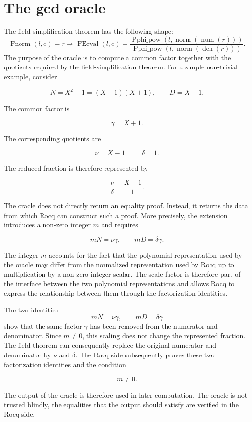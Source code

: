 \documentclass[11pt]{article}
\begin{document}
\section{The gcd oracle}
The field-simplification theorem has the following shape:
\[
 \operatorname{Fnorm}(l,e)=r \Longrightarrow
 \operatorname{FEeval}(l,e)=
 \frac{\operatorname{Pphi\_pow}(l,\operatorname{norm}(\operatorname{num}(r)))}
  {\operatorname{Pphi\_pow}(l,\operatorname{norm}(\operatorname{den}(r)))}.
\]
The purpose of the oracle is to compute a common factor together with the
quotients required by the field-simplification theorem. For a simple
non-trivial example, consider

$$
  N=X^2-1=(X-1)(X+1),
  \qquad
  D=X+1.
$$

The common factor is

$$
  \gamma=X+1.
$$

The corresponding quotients are

$$
  \nu=X-1,
  \qquad
  \delta=1.
$$

The reduced fraction is therefore represented by

$$
  \frac{\nu}{\delta}
  =
  \frac{X-1}{1}.
$$

The oracle does not directly return an equality proof. Instead, it returns
the data from which Rocq can construct such a proof. More precisely, the
extension introduces a non-zero integer $m$ and requires

$$
  mN=\nu\gamma,
  \qquad
  mD=\delta\gamma.
$$

The integer $m$ accounts for the fact that the polynomial representation
used by the oracle may differ from the normalized representation used by
Rocq up to multiplication by a non-zero integer scalar. The scale factor
is therefore part of the interface between the two polynomial
representations and allows Rocq to express the relationship between them
through the factorization identities.

The two identities
\[
  mN=\nu\gamma,
  \qquad
  mD=\delta\gamma
\]
show that the same factor $\gamma$ has been removed from the numerator and
denominator. Since $m\ne0$, this scaling does not change the represented
fraction. The field theorem can consequently replace the original numerator
and denominator by $\nu$ and $\delta$.
The Rocq side subsequently proves these two factorization identities and
the condition

$$
  m\ne0.
$$

The output of the oracle is therefore used in later computation. The oracle is not trusted blindly, the equalities that the output should satisfy are verified in the Rocq side.
\end{document}

